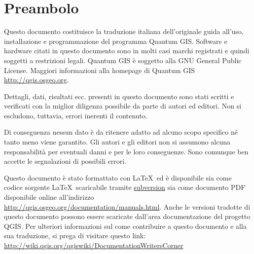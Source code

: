 
\newcommand\qgistip[1]{\raggedright\small{#1}}
\renewcommand{\topfraction}{0.85}
\renewcommand{\textfraction}{0.1}
\renewcommand{\floatpagefraction}{0.75}

\thispagestyle{empty}
\cleardoublepage
{}
{}


\section*{Preambolo}


\vspace{1cm}

Questo documento costituisce la traduzione italiana dell'originale
guida all'uso, installazione e programmazione del programma Quantum
GIS. Software e hardware citati in questo documento sono in
molti casi marchi registrati e quindi soggetti a restrizioni
legali. Quantum GIS è soggetto alla GNU General Public License. Maggiori
informazioni alla homepage di Quantum GIS
\url{http://qgis.osgeo.org}.

Dettagli, dati, risultati ecc. presenti in questo documento sono stati
scritti e verificati con la miglior diligenza possibile da parte di autori
ed editori. Non si escludono, tuttavia, errori inerenti il contenuto.

Di conseguenza nessun dato è da ritenere adatto ad alcuno scopo specifico
né tanto meno viene garantito. Gli autori e gli editori non si assumono alcuna responsabilità per eventuali
danni e per le loro conseguenze. Sono comunque ben accette le segnalazioni
di possibili errori.

Questo documento è stato formattato con \LaTeX~ed è disponibile sia come codice sorgente \LaTeX~scaricabile
tramite \href{http://wiki.qgis.org/qgiswiki/DocumentationWritersCorner}{subversion} sia
come documento PDF disponibile online all'indirizzo \url{http://qgis.osgeo.org/documentation/manuals.html}.
Anche le versioni tradotte di questo documento possono essere scaricate dall'area documentazione
del progetto QGIS. Per ulteriori informazioni sul come contribuire a questo documento e alla sua
traduzione, si prega di visitare questo link:
\url{http://wiki.qgis.org/qgiswiki/DocumentationWritersCorner}

